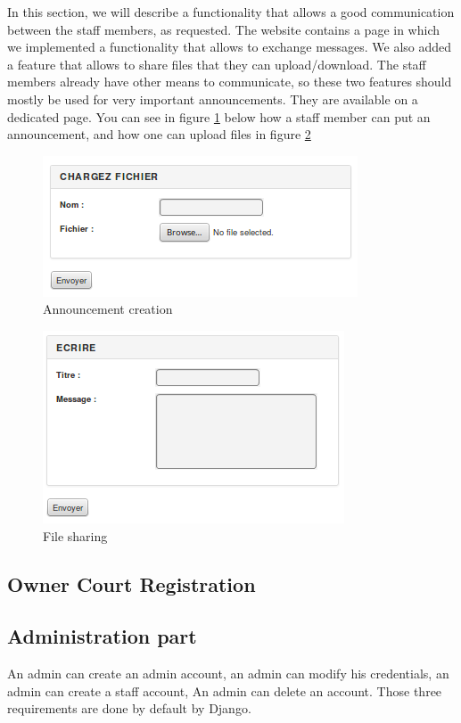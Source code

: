 \documentclass[a4paper, 12pt]{article}
\begin{document}
In this section, we will describe a functionality that allows a good communication between the staff members, as requested. The website contains a page in which we implemented a functionality that allows to exchange messages. We also added a feature that allows to share files that they can upload/download. The staff members already have other means to communicate, so these two features should mostly be used for very important announcements. They are available on a dedicated page. You can see in figure \ref{annonce} below how a staff member can put an announcement, and how one can upload files in figure \ref{file} \\

\begin{figure}[h]
  \caption{\label{annonce} Announcement creation}
  \includegraphics[scale=0.7]{annonce.png}
\end{figure}
\begin{figure}[h]
  \caption{\label{file} File sharing}
  \includegraphics[scale=0.7]{fichier.png}
\end{figure}

 
\subsection*{Owner Court Registration}
\subsection*{Administration part}
An admin can create an admin account, an admin can modify his credentials, an admin can create a staff account, An admin can delete an account. Those three requirements are done by default by Django.\\
\end{document}
